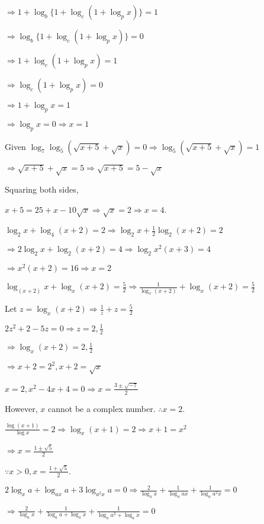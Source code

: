   $\Rightarrow 1 + \log_b\{1 + \log_c(1 + \log_px)\} = 1$

  $\Rightarrow \log_b\{1 + \log_c(1 + \log_px)\} = 0$

  $\Rightarrow 1 + \log_c(1 + \log_px) = 1$

  $\Rightarrow \log_c(1 + \log_px) = 0$

  $\Rightarrow 1 + \log_px = 1$

  $\Rightarrow \log_px = 0 \Rightarrow x = 1$
\item Given $\log_7\log_5(\sqrt{x + 5} + \sqrt{x}) = 0 \Rightarrow \log_5(\sqrt{x + 5} + \sqrt{x}) = 1$

  $\Rightarrow \sqrt{x + 5} + \sqrt{x} = 5 \Rightarrow \sqrt{x + 5} = 5 - \sqrt{x}$

  Squaring both sides,

  $x + 5 = 25 + x - 10\sqrt{x}\Rightarrow \sqrt{x} = 2\Rightarrow x = 4$.
\item $\log_2x + \log_4(x + 2) = 2 \Rightarrow \log_2x + \frac{1}{2}\log_2(x + 2) = 2$

  $\Rightarrow 2\log_2x + \log_2(x + 2) = 4 \Rightarrow \log_2x^2(x + 3) = 4$

  $\Rightarrow x^2(x + 2) = 16 \Rightarrow x = 2$
\item $\log_{(x + 2)}x + \log_x(x + 2) = \frac{5}{2} \Rightarrow \frac{1}{\log_x(x + 2)} + \log_x(x + 2) = \frac{5}{2}$

  Let $z = \log_x(x + 2) \Rightarrow \frac{1}{z} + z = \frac{5}{2}$

  $2z^2 + 2 - 5z = 0 \Rightarrow z = 2, \frac{1}{2}$

  $\Rightarrow \log_x(x + 2) = 2, \frac{1}{2}$

  $\Rightarrow x + 2 = 2^2, x + 2 = \sqrt{x}$

  $x = 2, x^2 - 4x + 4 = 0 \Rightarrow x = \frac{3\pm\sqrt{-7}}{2}$

  However, $x$ cannot be a complex number. $\therefore x = 2$.
\item $\frac{\log(x + 1)}{\log x} = 2\Rightarrow \log_x(x + 1) = 2 \Rightarrow x + 1 = x^2$

  $\Rightarrow x = \frac{1\pm \sqrt{5}}{2}$

  $\because x > 0, x = \frac{1 + \sqrt{5}}{2}$.
\item $2\log_xa + \log_{ax}a + 3\log_{a^2x}a = 0 \Rightarrow \frac{2}{\log_ax} + \frac{1}{\log_aax} + \frac{1}{\log_aa^2x} = 0$

  $\Rightarrow \frac{2}{\log_ax} + \frac{1}{\log_aa + \log_ax} + \frac{1}{\log_aa^2 + \log_ax} = 0$

